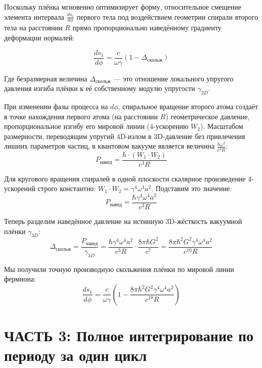 \documentclass[12pt,a4paper]{article}
\begin{document}
Поскольку плёнка мгновенно оптимизирует форму, относительное смещение элемента интервала $\frac{ds_1}{d\phi}$ первого тела под воздействием геометрии спирали второго тела на расстоянии $R$ прямо пропорционально наведённому градиенту деформации нормалей:

\begin{equation}
\frac{ds_1}{d\phi} = \frac{c}{\omega \gamma} \left( 1 - \Delta_{скольж} \right)
\end{equation}

Где безразмерная величина $\Delta_{скольж}$ — это отношение локального упругого давления изгиба плёнки к её собственному модулю упругости $\gamma_{3D}$.

При изменении фазы процесса на $d\phi$, спиральное вращение второго атома создаёт в точке нахождения первого атома (на расстоянии $R$) геометрическое давление, пропорциональное изгибу его мировой линии (4-ускорению $W_2$). Масштабом размерности, переводящим упругий 4D-излом в 3D-давление без привлечения лишних параметров частиц, в квантовом вакууме является величина $\frac{\hbar \omega^2}{c^3 R}$:
\begin{equation}
P_{навед} = \frac{\hbar \cdot (W_1 \cdot W_2)}{c^3 R}
\end{equation}

Для кругового вращения спиралей в одной плоскости скалярное произведение 4-ускорений строго константно: $W_1 \cdot W_2 = \gamma^4 \omega^4 a^2$. Подставим это значение:
\begin{equation}
P_{навед} = \frac{\hbar \gamma^4 \omega^4 a^2}{c^3 R}
\end{equation}

Теперь разделим наведённое давление на истинную 3D-жёсткость вакуумной плёнки $\gamma_{3D}$:
\begin{equation}
\Delta_{скольж} = \frac{P_{навед}}{\gamma_{3D}} = \frac{\hbar \gamma^4 \omega^4 a^2}{c^3 R} \cdot \frac{8\pi \hbar G^2}{c^7} = \frac{8\pi \hbar^2 G^2 \gamma^4 \omega^4 a^2}{c^{10} R}
\end{equation}

Мы получили точную производную скольжения плёнки по мировой линии фермиона:
\begin{equation}
\frac{ds_1}{d\phi} = \frac{c}{\omega \gamma} \left( 1 - \frac{8\pi \hbar^2 G^2 \gamma^4 \omega^4 a^2}{c^{10} R} \right)
\end{equation}

\section*{ЧАСТЬ 3: Полное интегрирование по периоду за один цикл}
\end{document}
